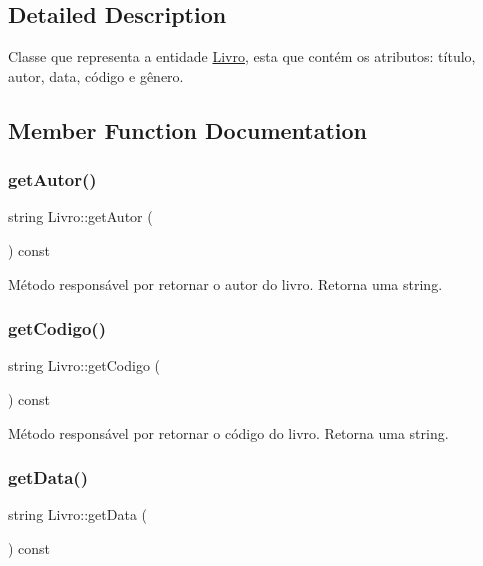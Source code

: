 \subsection{Detailed Description}
Classe que representa a entidade \hyperlink{classLivro}{Livro}, esta que contém os atributos\+: título, autor, data, código e gênero. 

\subsection{Member Function Documentation}
\mbox{\label{classLivro_ae8f2ea7e82a3ddd33e1d0e242c43f3e5}} 
\subsubsection{\texorpdfstring{get\+Autor()}{getAutor()}}
{\footnotesize\ttfamily string Livro\+::get\+Autor (\begin{DoxyParamCaption}{ }\end{DoxyParamCaption}) const\hspace{0.3cm}{\ttfamily [inline]}}

Método responsável por retornar o autor do livro. Retorna uma string. \mbox{\label{classLivro_ac0bf6014dae1a0a3cb15ffac8b886f13}} 
\subsubsection{\texorpdfstring{get\+Codigo()}{getCodigo()}}
{\footnotesize\ttfamily string Livro\+::get\+Codigo (\begin{DoxyParamCaption}{ }\end{DoxyParamCaption}) const\hspace{0.3cm}{\ttfamily [inline]}}

Método responsável por retornar o código do livro. Retorna uma string. \mbox{\label{classLivro_aaf7d614049f22c09631bae2a5f83c16a}} 
\subsubsection{\texorpdfstring{get\+Data()}{getData()}}
{\footnotesize\ttfamily string Livro\+::get\+Data (\begin{DoxyParamCaption}{ }\end{DoxyParamCaption}) const\hspace{0.3cm}{\ttfamily [inline]}}

